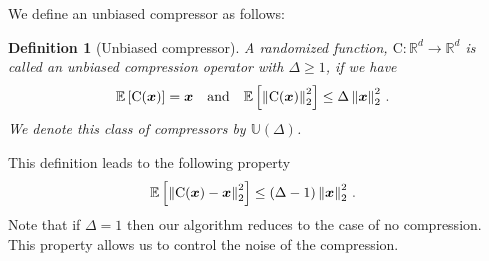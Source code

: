 \documentclass[twoside]{article}
\newtheorem{definition}{Definition}
\begin{document}
We define an unbiased compressor as follows:
\begin{definition}[Unbiased compressor]\label{def:unbiased}
A randomized function, $\text{C}:\mathbb{R}^{d}\rightarrow\mathbb{R}^{d}$ is called an unbiased compression operator with $\Delta\geq 1$, if we have 
\begin{align}\notag
\mathbb{E}\left[\text{C}(\boldsymbol{x})\right]&=\boldsymbol{x}\nonumber \quad \textrm{and} \quad    \mathbb{E}\left[\left\|\text{C}(\boldsymbol{x})\right\|^2_2\right] \leq \Delta\left\|\boldsymbol{x}\right\|^2_2\notag \, .
\end{align}
We denote this class of compressors by $\mathbb{U}(\Delta)$.
\end{definition}
This definition leads to the following property 
\begin{align}\notag
    \mathbb{E}\left[\left\|\text{C}(\boldsymbol{x})-\boldsymbol{x}\right\|^2_2\right]&\leq \left(\Delta-1\right)\left\|\boldsymbol{x}\right\|^2_2\, .
\end{align}
Note that if $\Delta=1$ then our algorithm reduces to the case of no compression. 
This property allows us to control the noise of the compression.
\end{document}
